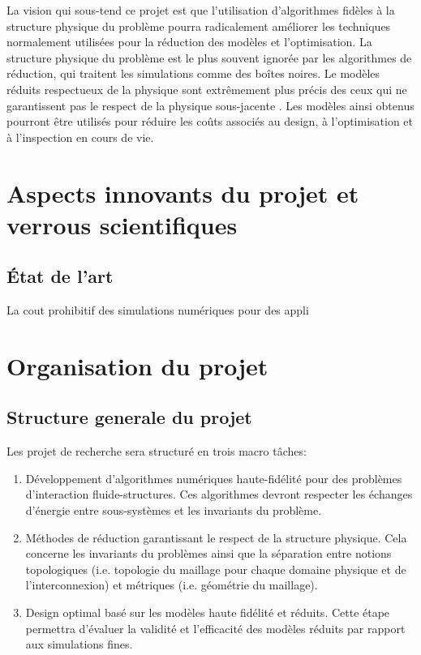 \documentclass[french]{article}
\begin{document}
La vision qui sous-tend ce projet est que l'utilisation d'algorithmes fidèles \`a la structure physique du problème pourra radicalement améliorer les techniques normalement utilisées pour la réduction des modèles et l'optimisation. La structure physique du problème est le plus souvent ignorée par les algorithmes de réduction, qui traitent les simulations comme des bo\^{i}tes noires. Le modèles réduits respectueux de la physique sont extrêmement plus précis des ceux qui ne garantissent pas le respect de la physique sous-jacente \cite{lee2020}. Les modèles ainsi obtenus pourront être utilisés pour réduire les  co\^{u}ts associés au design, \`a l'optimisation et \`a l'inspection en cours de vie.


\section{Aspects innovants du projet et verrous scientifiques}

\subsection{État de l'art}
La cout prohibitif des simulations numériques pour des appli 



\section{Organisation du projet}

\subsection{Structure generale du projet}

Les projet de recherche sera structuré en trois macro tâches:
\begin{enumerate}
	\item Développement d'algorithmes numériques haute-fidélité pour des problèmes d'interaction fluide-structures. Ces algorithmes devront respecter les échanges d'énergie entre sous-systèmes et les invariants du problème.
	\item Méthodes de réduction garantissant le respect de la structure physique. Cela concerne les invariants du problèmes ainsi que la séparation entre notions topologiques (i.e. topologie du maillage pour chaque domaine physique et  de l'interconnexion) et métriques (i.e. géométrie du maillage).
	\item Design optimal basé sur les modèles haute fidélité et réduits. Cette étape permettra d'évaluer la validité et l'efficacit\'e des modèles réduits par rapport aux simulations fines.
\end{enumerate}
\end{document}
